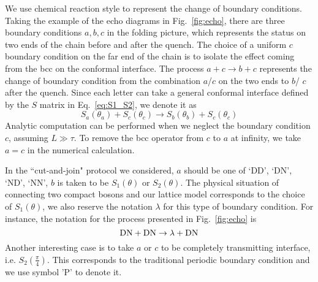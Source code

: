 
We use chemical reaction style to represent the change of boundary conditions. Taking the example of the echo diagrams in Fig.~\ref{fig:echo}, there are three boundary conditions $a,b,c$ in the folding picture, which represents the status on two ends of the chain before and after the quench. The choice of a uniform $c$ boundary condition on the far end of the chain is to isolate the effect coming from the bcc on the conformal interface. The process $a + c \rightarrow b + c$ represents the change of boundary condition from the combination $a$/$c$ on the two ends to $b$/ $c$ after the quench. Since each letter can take a general conformal interface defined by the $S$ matrix in Eq.~\eqref{eq:S1_S2}, we denote it as
\begin{equation}
S_a( \theta_a ) + S_c( \theta_c) \rightarrow S_b( \theta_b )  + S_c( \theta_c ) 
\end{equation}
Analytic computation can be performed when we neglect the boundary condition $c$, assuming $L \gg \tau$. To remove the bcc operator from $c$ to $a$ at infinity, we take $a = c$ in the numerical calculation. 

In the ``cut-and-join" protocol we considered, $a$ should be one of `DD', `DN', `ND', `NN', $b$ is taken to be $S_1( \theta )$ or $S_2( \theta )$. The physical situation of connecting two compact bosons and our lattice model corresponds to the choice of $S_1( \theta)$, we also reserve the notation $\lambda$ for this type of boundary condition. For instance, the notation for the process presented in Fig.~\ref{fig:echo} is
\begin{equation}
{\rm DN }  + {\rm DN} \rightarrow \lambda + { \rm DN} 
\end{equation}
Another interesting case is to take $a$ or $c$ to be completely transmitting interface, i.e. $S_2( \frac{\pi}{4} )$. This corresponds to the traditional periodic boundary condition and we use symbol 'P' to denote it. 


